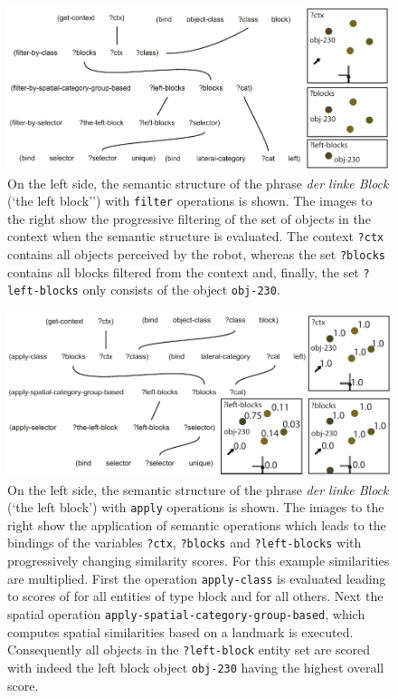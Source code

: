 \begin{figure}
\begin{center}
\includegraphics[width=.8\columnwidth]{figs/semantic-structure-filtering-der-linke-block}
\end{center}
\caption[Category membership semantics]{On the left side, the semantic structure of the phrase 
\textit{der linke Block} (`the left block'') with {\footnotesize\tt filter} operations is shown. The images to 
the right show the progressive filtering of the set of objects in the context when the 
semantic structure is evaluated. The context {\footnotesize\tt ?ctx} contains all objects
perceived by the robot, whereas the set {\footnotesize\tt ?blocks} contains all blocks
filtered from the context and, finally, the set {\footnotesize\tt ?left-blocks} 
only consists of the object {\footnotesize\tt obj-230}.}
\label{f:filtering-operations}
\end{figure}

\begin{figure}
\begin{center}
\includegraphics[width=.8\columnwidth]{figs/semantic-structure-apply-der-linke-block}
\end{center}
\caption[Lenient categorization semantics]{%
On the left side, the semantic structure of the phrase
\textit{der linke Block} (`the left block') with {\footnotesize\tt apply} operations is shown. The images to
the right show the application of semantic operations which leads to the
bindings of the variables {\footnotesize\tt ?ctx}, {\footnotesize\tt ?blocks} and {\footnotesize\tt ?left-blocks}
with progressively changing similarity scores. For this example similarities are
multiplied. First the operation {\footnotesize\tt apply-class} is evaluated leading to
scores of for all entities of type block and
for all others. Next the spatial operation {\footnotesize\tt apply-spatial-category-group-based}, 
which computes spatial similarities based on a landmark is executed.
Consequently all objects in the {\footnotesize\tt ?left-block} entity set are scored with
indeed the left block object {\footnotesize\tt obj-230} having the highest
overall score.}
\label{f:apply-operations}
\end{figure}

